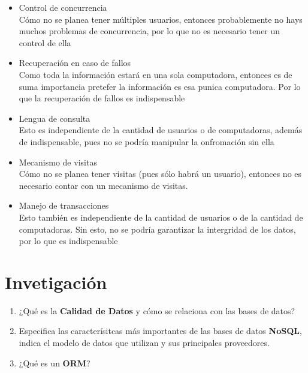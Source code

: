 \documentclass{article}
\begin{document}
\begin{enumerate}[label=\alph*.]
{\begin{itemize}
{                negocio, pues manejan información delicada acerca de clientes,
                proveedores, empleados, entre otros.}
                \item {Control de concurrencia \\
                Cómo no se planea tener múltiples usuarios, entonces probablemente
                no hays muchos problemas de concurrencia, por lo que no es 
                necesario tener un control de ella}
                \item {Recuperación en caso de fallos \\
                Como toda la información estará en una sola computadora, 
                entonces es de suma importancia pretefer la información es esa 
                punica computadora. Por lo que la recuperación de fallos es 
                indispensable}
                \item {Lengua de consulta \\
                Esto es independiente de la cantidad de usuarios o de 
                computadoras, además de indispensable, pues no se podría 
                manipular la onfromación sin ella}
                \item {Mecanismo de visitas \\
                Cómo no se planea tener visitas (pues sólo habrá un usuario), 
                entonces no es necesario contar con un mecanismo de visitas.
                }
                \item {Manejo de transacciones \\
                Esto también es independiente de la cantidad de usuarios o de la
                cantidad de computadoras. Sin esto, no se podría garantizar la 
                intergridad de los datos, por lo que es indispensable}
            \end{itemize}
        }
    \end{enumerate}

    \section{Invetigación}
    \begin{enumerate}[label=\alph*.]
        \item {
            ¿Qué es la \textbf{Calidad de Datos} y cómo se relaciona con las 
            bases de datos?
        }
        \item {
            Especifica las caracterísitcas más importantes de las bases de datos
            \textbf{NoSQL}, indica el modelo de datos que utilizan y sus 
            principales proveedores.
        }
        \item {
            ¿Qué es un \textbf{ORM}?
        }
    \end{enumerate}
\end{document}

